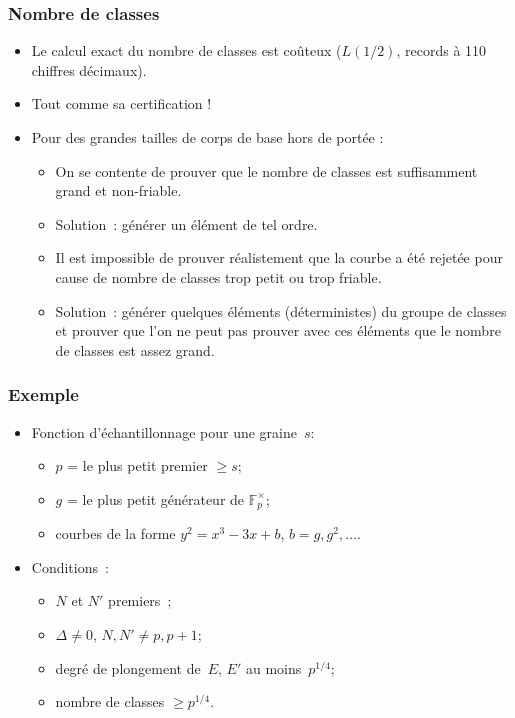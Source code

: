 \documentclass[francais]{beamer}
\newcommand{\F}{\mathbb{F}}
\begin{document}
\begin{frame}\frametitle{Nombre de classes}
\begin{itemize}
\item Le calcul exact du nombre de classes est
coûteux
($L(1/2)$, records à 110 chiffres décimaux).
\item Tout comme sa certification !
\medskip
\item Pour des grandes tailles de corps de base hors de portée :
\begin{itemize}
\item On se contente de prouver que le nombre de classes est
suffisamment grand et non-friable.
\item Solution : générer un élément de tel ordre.
\smallskip
\item Il est impossible de prouver réalistement que la courbe
a été rejetée pour cause de nombre de classes trop petit ou trop friable.
\item Solution : générer quelques éléments (déterministes) du groupe de classes
et prouver que l'on ne peut pas prouver avec ces éléments
que le nombre de classes est assez grand.
\end{itemize}
\end{itemize}
\end{frame}

\begin{frame}\frametitle{Exemple}
\begin{itemize}
\item Fonction d'échantillonnage pour une graine~$s$:
\begin{itemize}
\item $p$ = le plus petit premier $≥ s$;
\item $g$ = le plus petit générateur de $\F_p^{×}$;
\item courbes de la forme $y^2 = x^3 - 3x + b$, $b = g, g^2, …$.
\end{itemize}
\bigskip
\item Conditions :
\begin{itemize}
\item $N$ et $N'$ premiers ;
\item $Δ ≠ 0$, $N, N' ≠ p, p + 1$;
\item degré de plongement de~$E$, $E'$ au moins~$p^{1/4}$;
\item nombre de classes $≥ p^{1/4}$.
\end{itemize}
\end{itemize}
\end{frame}
\end{document}
